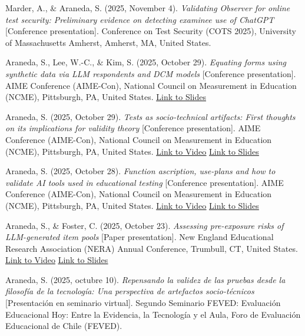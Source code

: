 \documentclass[10.5pt]{article}
\newcommand{\link}[2]{\href{#1}{\color{cvaccent}\uline{#2}}}
\newcommand{\pubentry}[2]{%
  \par\noindent\hangindent=14pt\hangafter=1\raggedright\color{cvink}#1\par\vspace{9pt}%
}
\begin{document}
\pubentry{Marder, A., \& Araneda, S. (2025, November 4). \textit{Validating Observer for online test security: Preliminary evidence on detecting examinee use of ChatGPT} [Conference presentation]. Conference on Test Security (COTS 2025), University of Massachusetts Amherst, Amherst, MA, United States.}{cots2025.png}
\pubentry{Araneda, S., Lee, W.-C., \& Kim, S. (2025, October 29). \textit{Equating forms using synthetic data via LLM respondents and DCM models} [Conference presentation]. AIME Conference (AIME-Con), National Council on Measurement in Education (NCME), Pittsburgh, PA, United States. \link{https://www.researchgate.net/publication/397016164_Equating_Forms_Using_Synthetic_Data_via_LLM_Respondents_and_Auxiliary_DCM_Models}{Link to Slides}}{aimecon.png}
\pubentry{Araneda, S. (2025, October 29). \textit{Tests as socio-technical artifacts: First thoughts on its implications for validity theory} [Conference presentation]. AIME Conference (AIME-Con), National Council on Measurement in Education (NCME), Pittsburgh, PA, United States. \link{https://www.youtube.com/watch?v=wiZpPjoCtw4}{Link to Video} \link{https://www.researchgate.net/publication/397016643_Presentation_Tests_as_Socio-Technical_Artifacts_First_Thoughts_on_its_Implications_for_Validity_Theory}{Link to Slides}}{aimecon.png}
\pubentry{Araneda, S. (2025, October 28). \textit{Function ascription, use-plans and how to validate AI tools used in educational testing} [Conference presentation]. AIME Conference (AIME-Con), National Council on Measurement in Education (NCME), Pittsburgh, PA, United States. \link{https://www.youtube.com/watch?v=WHDiJHOZld8}{Link to Video} \link{https://www.researchgate.net/publication/397016162_Presentation_Function_Ascription_Use-plans_and_How_to_Validate_AI_Tools_Used_in_Educational_Testing}{Link to Slides}}{aimecon.png}
\pubentry{Araneda, S., \& Foster, C. (2025, October 23). \textit{Assessing pre-exposure risks of LLM-generated item pools} [Paper presentation]. New England Educational Research Association (NERA) Annual Conference, Trumbull, CT, United States. \link{https://www.youtube.com/watch?v=VMlFHszRGck}{Link to Video} \link{https://www.researchgate.net/publication/397016004_Assessing_Pre-Exposure_Risks_of_LLM-Generated_Item_Pools}{Link to Slides}}{nera.png}
\pubentry{Araneda, S. (2025, octubre 10). \textit{Repensando la validez de las pruebas desde la filosof\'ia de la tecnolog\'ia: Una perspectiva de artefactos socio-t\'ecnicos} [Presentaci\'on en seminario virtual]. Segundo Seminario FEVED: Evaluaci\'on Educacional Hoy: Entre la Evidencia, la Tecnolog\'ia y el Aula, Foro de Evaluaci\'on Educacional de Chile (FEVED).}{feved_seminar.jpg}
\end{document}
